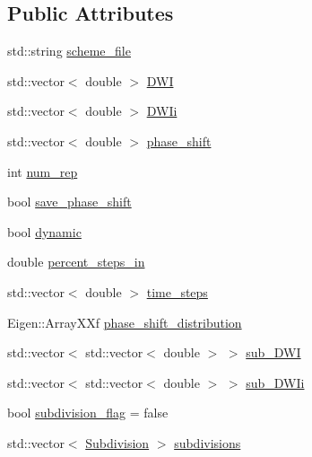 \subsection*{Public Attributes}
\begin{DoxyCompactItemize}
\item 
std\+::string \hyperlink{class_simulable_sequence_a9898335af9d8f639f65b73eeac8efb53}{scheme\+\_\+file}
\item 
std\+::vector$<$ double $>$ \hyperlink{class_simulable_sequence_a083961d839ed1433206ccbc481996409}{D\+WI}
\item 
std\+::vector$<$ double $>$ \hyperlink{class_simulable_sequence_a3708afa1322d72b59d3be20b740d107c}{D\+W\+Ii}
\item 
std\+::vector$<$ double $>$ \hyperlink{class_simulable_sequence_a8691c0451c305869064862e30986c34c}{phase\+\_\+shift}
\item 
int \hyperlink{class_simulable_sequence_aa524c45db6c27dd21acacf97d7951ac2}{num\+\_\+rep}
\item 
bool \hyperlink{class_simulable_sequence_aa29f58ae224d92dd467a0845bd207324}{save\+\_\+phase\+\_\+shift}
\item 
bool \hyperlink{class_simulable_sequence_a1de2d00a939f550af1947ae25acc4b97}{dynamic}
\item 
double \hyperlink{class_simulable_sequence_a43e046af3bf6c498a5ad232058de8a90}{percent\+\_\+steps\+\_\+in}
\item 
std\+::vector$<$ double $>$ \hyperlink{class_simulable_sequence_a7e7e1a0de6045046061ffccaba4fa5ee}{time\+\_\+steps}
\item 
Eigen\+::\+Array\+X\+Xf \hyperlink{class_simulable_sequence_a4e45e2d935a05a7375b04718a49c9af7}{phase\+\_\+shift\+\_\+distribution}
\item 
std\+::vector$<$ std\+::vector$<$ double $>$ $>$ \hyperlink{class_simulable_sequence_a2686ccfa89396eeadd0a0d4f7842623c}{sub\+\_\+\+D\+WI}
\item 
std\+::vector$<$ std\+::vector$<$ double $>$ $>$ \hyperlink{class_simulable_sequence_a1e958cc7d15337fa3ae0e58c8330f212}{sub\+\_\+\+D\+W\+Ii}
\item 
bool \hyperlink{class_simulable_sequence_ae9e6e581ba16bbf81b693c0e4943bbf9}{subdivision\+\_\+flag} = false
\item 
std\+::vector$<$ \hyperlink{class_subdivision}{Subdivision} $>$ \hyperlink{class_simulable_sequence_a77c721d4650578fdc3f44adfa91c030e}{subdivisions}
\end{DoxyCompactItemize}


